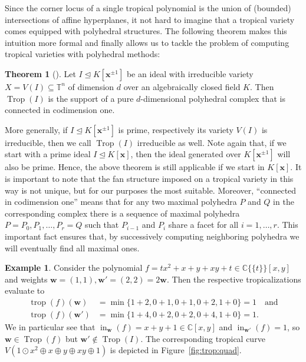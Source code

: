 \documentclass[
  paper=a4,
  titlepage,
  bibliography=totoc,
  pagesize=pdftex
]{scrartcl}
\numberwithin{figure}{section}
\numberwithin{equation}{section}
\numberwithin{table}{section}
\newcommand*\setC{\mathds{C}}
\newcommand*\setT{\mathds{T}}
\newcommand*\puiseux[2]{#1\{\!\{#2\}\!\}}
\newcommand*\CCt{\puiseux{\setC}{t}}
\let\vec\mathbf
\let\idealof\trianglelefteq
\DeclareMathOperator{\Trop}{Trop}
\DeclareMathOperator{\trop}{trop}
\DeclareMathOperator{\initial}{in}
\theoremstyle{definition}
\newtheorem{theorem}[definition]{Theorem}
\newtheorem{example}[definition]{Example}
\numberwithin{definition}{section}
\begin{document}
Since the corner locus of a single tropical polynomial is the union of (bounded)
intersections of affine hyperplanes, it not hard to imagine that a tropical variety comes
equipped with polyhedral structures. The following theorem makes this intuition more
formal and finally allows us to tackle the problem of computing tropical varieties with
polyhedral methods:

\begin{theorem}[{\cite[Theorem~3.5.1]{sturmMacTrop}}]
  \label{thm:tropComplexConn}
  Let $I \idealof K[\vec x^{\pm1}]$ be an ideal with irreducible variety $X = V(I)
  \subseteq \setT^n$ of dimension $d$ over an algebraically closed field $K$. Then
  $\Trop(I)$ is the support of a pure $d$-dimensional polyhedral complex that is connected
  in codimension one.
\end{theorem}

More generally, if $I \idealof K[\vec x^{\pm1}]$ is prime, respectively its variety $V(I)$
is irreducible, then we call $\Trop(I)$ irreducible as well. Note again that, if we start
with a prime ideal $I \idealof K[\vec x]$, then the ideal generated over $K[\vec
x^{\pm1}]$ will also be prime. Hence, the above theorem is still applicable if we start in
$K[\vec x]$. It is important to note that the fan structure imposed on a tropical variety
in this way is not unique, but for our purposes the most suitable. Moreover,
\enquote{connected in codimension one} means that for any two maximal polyhedra $P$ and
$Q$ in the corresponding complex there is a sequence of maximal polyhedra $P = P_0, P_1,
\dots, P_r = Q$ such that $P_{i-1}$ and $P_i$ share a facet for all $i = 1, \dots, r$.
This important fact ensures that, by successively computing neighboring polyhedra we will
eventually find all maximal ones.

\begin{example}
  \label{ex:notFan}
  Consider the polynomial $f = tx^2 + x + y + xy + t \in \CCt[x,y]$ and weights $\vec w =
  (1,1), \vec w' = (2,2) = 2 \vec w$. Then the respective tropicalizations evaluate to
  \begin{align*}
    \trop(f)(\vec w) &= \min \{ 1 + 2, 0 + 1, 0 + 1, 0 + 2, 1 + 0 \} = 1 \quad
    \text{and} \\
    \trop(f)(\vec w') &= \min \{ 1 + 4, 0 + 2, 0 + 2, 0 + 4, 1 + 0 \} = 1.
  \end{align*}
  We in particular see that $\initial_{\vec w}(f) = x+y+1 \in \setC[x,y]$ and
  $\initial_{\vec w'}(f) = 1$, so $\vec w \in \Trop(f)$ but $\vec w' \not\in \Trop(I)$.
  The corresponding tropical curve $V(1\odot x^2 \oplus x \oplus y \oplus xy \oplus 1)$ is
  depicted in Figure~\ref{fig:trop:quad}.
\end{example}
\end{document}
